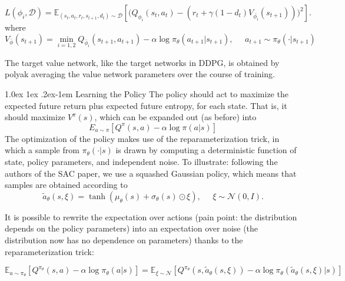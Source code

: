 \documentclass[a4paper, 11pt]{article}
\makeatletter
\renewcommand{\paragraph}{%
	\@startsection{paragraph}{4}%
	{\z@}{1.0ex \@plus 1ex \@minus .2ex}{-1em}%
	{\normalfont\normalsize\bfseries}%
}
\makeatother
\begin{document}
	\begin{equation} \label{eq11:lossQ}
	L(\phi_i, {\mathcal D}) = \mathbb{E}_{(s_t,a_t,r_t,s_{t+1},d_t) \sim \mathcal D}\left[ \Bigg( Q_{\phi_i}(s_t,a_t) - \left(r_t + \gamma (1 - d_t) V_{\bar{\phi_i}}(s_{t+1}) \right) \Bigg)^2 \right].
	\end{equation}
	where
	\begin{equation}
	V_{\bar{\phi}}(s_{t+1}) = \min_{i=1,2}Q_{\bar{\phi}_i}(s_{t+1},a_{t+1}) - \alpha \log \pi_\theta(a_{t+1}|s_{t+1}), \;\;\;\;\; a_{t+1} \sim \pi_\theta(\cdot|s_{t+1})
	\end{equation}
	
	
	The target value network, like the target networks in DDPG, is obtained by polyak averaging the value network parameters over the course of training.
	
	
	\paragraph{Learning the Policy} The policy should act to maximize the expected future return plus expected future entropy, for each state. That is, it should maximize $V^{\pi}(s)$, which can be expanded out (as before) into
			\begin{equation}
	E_{a \sim \pi}[Q^{\pi}(s,a) - \alpha \log \pi(a|s)]
			\end{equation}
	The optimization of the policy makes use of the reparameterization trick, in which a sample from $\pi_{\theta}(\cdot|s)$ is drawn by computing a deterministic function of state, policy parameters, and independent noise. To illustrate: following the authors of the SAC paper, we use a squashed Gaussian policy, which means that samples are obtained according to
			\begin{equation}
	\tilde{a}_{\theta}(s, \xi) = \tanh\left( \mu_{\theta}(s) + \sigma_{\theta}(s) \odot \xi \right), \;\;\;\;\; \xi \sim \mathcal{N}(0, I).
			\end{equation}
			
	It is possible to rewrite the expectation over actions (pain point: the distribution depends on the policy parameters) into an expectation over noise (the distribution now has no dependence on parameters) thanks to the reparameterization trick:
	
				\begin{equation}
	\mathbb{E}_{a \sim \pi_{\theta}}[{Q^{\pi_{\theta}}(s,a) - \alpha \log \pi_{\theta}(a|s)}] = \mathbb{E}_{\xi \sim \mathcal{N}}[{Q^{\pi_{\theta}}(s,\tilde{a}_{\theta}(s,\xi)) - \alpha \log \pi_{\theta}(\tilde{a}_{\theta}(s,\xi)|s)}]
				\end{equation}
				
\end{document}
